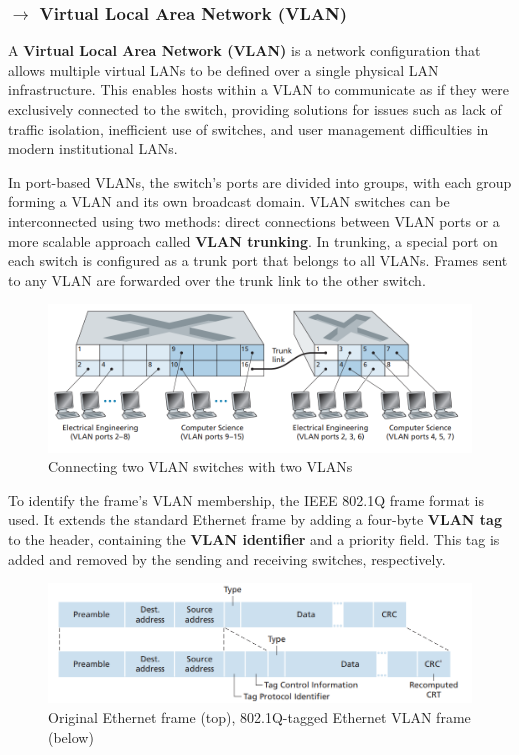 \clearpage
\subsubsection[5.5.3 Virtual Local Area Network (VLAN)]{$\rightarrow$ Virtual Local Area Network (VLAN)}

\begin{mdframed}
    A \textbf{Virtual Local Area Network (VLAN)} is a network configuration that allows multiple virtual LANs to be defined over a single physical LAN infrastructure. This enables hosts within a VLAN to communicate as if they were exclusively connected to the switch, providing solutions for issues such as lack of traffic isolation, inefficient use of switches, and user management difficulties in modern institutional LANs.
\end{mdframed}

\noindent In port-based VLANs, the switch's ports are divided into groups, with each group forming a VLAN and its own broadcast domain. VLAN switches can be interconnected using two methods: direct connections between VLAN ports or a more scalable approach called \textbf{VLAN trunking}. In trunking, a special port on each switch is configured as a trunk port that belongs to all VLANs. Frames sent to any VLAN are forwarded over the trunk link to the other switch.

\begin{figure}[H]
    \centering
    \includegraphics[width = 0.8\linewidth]{img/5/port-based-VLAN.png}
    \caption{Connecting two VLAN switches with two VLANs \cite{Kurose2017}}
    \label{fig:port-based-VLAN}
\end{figure}

\noindent To identify the frame's VLAN membership, the IEEE 802.1Q frame format is used. It extends the standard Ethernet frame by adding a four-byte \textbf{VLAN tag} to the header, containing the \textbf{VLAN identifier} and a priority field. This tag is added and removed by the sending and receiving switches, respectively.

\begin{figure}[H]
    \centering
    \includegraphics[width = 0.7\linewidth]{img/5/802.1Q-tagged-VLAN-frame.png}
    \caption{Original Ethernet frame (top), 802.1Q-tagged Ethernet VLAN frame (below) \cite{Kurose2017}}
    \label{fig:802.1Q-tagged-VLAN-frame}
\end{figure}

